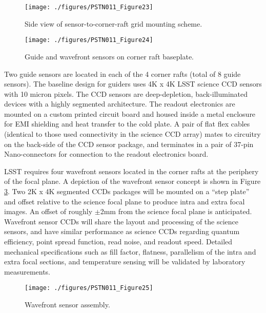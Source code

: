 \begin{figure}[htbp]
\begin{center}
\texttt{[image: ./figures/PSTN011\_Figure23]}
\caption{Side view of sensor-to-corner-raft grid mounting scheme.}
\label{fig:Fig23}
\end{center}
\end{figure}

\begin{figure}[htbp]
\begin{center}
\texttt{[image: ./figures/PSTN011\_Figure24]}
\caption{Guide and wavefront sensors on corner raft baseplate.}
\label{fig:Fig24}
\end{center}
\end{figure}

Two guide sensors are located in each of the 4 corner rafts (total of 8 guide sensors). The baseline
design for guiders uses 4K x 4K LSST science CCD sensors with 10 micron pixels. The CCD sensors are
deep-depletion, back-illuminated devices with a highly segmented architecture. The readout electronics
are mounted on a custom printed circuit board and housed inside a metal enclosure for EMI shielding
and heat transfer to the cold plate. A pair of flat flex cables (identical to those used connectivity in the
science CCD array) mates to circuitry on the back-side of the CCD sensor package, and terminates in a
pair of 37-pin Nano-connectors for connection to the readout electronics board.

LSST requires four wavefront sensors located in the corner rafts at the periphery of the focal plane. A
depiction of the wavefront sensor concept is shown in Figure \ref{fig:Fig25}. Two 2K x 4K segmented CCDs
packages will be mounted on a “step plate” and offset relative to the science focal plane to produce
intra and extra focal images. An offset of roughly $\pm$2mm from the science focal plane is anticipated.
Wavefront sensor CCDs will share the layout and processing of the science sensors, and have similar
performance as science CCDs regarding quantum efficiency, point spread function, read noise, and
readout speed. Detailed mechanical specifications such as fill factor, flatness, parallelism of the intra
and extra focal sections, and temperature sensing will be validated by laboratory measurements.

\begin{figure}[htbp]
\begin{center}
\texttt{[image: ./figures/PSTN011\_Figure25]}
\caption{Wavefront sensor assembly.}
\label{fig:Fig25}
\end{center}
\end{figure}

